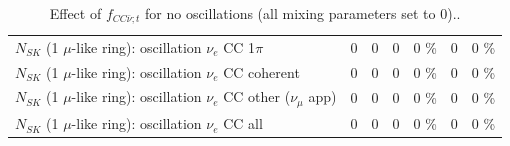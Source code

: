 \begin{table}
\begin{tabular}{| l | r | r | r  r | r  r |}
                     $N_{SK}$ (1 $\mu$-like ring): oscillation $\nu_e$ CC 1$\pi$ &               0 &               0 &               0 &        0 \%  &               0 &        0 \%  \\ 
                   $N_{SK}$ (1 $\mu$-like ring): oscillation $\nu_e$ CC coherent &               0 &               0 &               0 &        0 \%  &               0 &        0 \%  \\ 
      $N_{SK}$ (1 $\mu$-like ring): oscillation $\nu_e$ CC other ($\nu_\mu$ app) &               0 &               0 &               0 &        0 \%  &               0 &        0 \%  \\ 
                       $N_{SK}$ (1 $\mu$-like ring): oscillation $\nu_e$  CC all &               0 &               0 &               0 &        0 \%  &               0 &        0 \%  \\ 
\hline
\hline
\end{tabular}
\caption{ Effect of $f_{CC\bar{\nu}; t}$ for no oscillations (all mixing parameters set to 0).. }
\label{tab:num_xsec_norm_antinutonu_1RmuT_3f_osc_t13:0}
\end{table}
\clearpage
